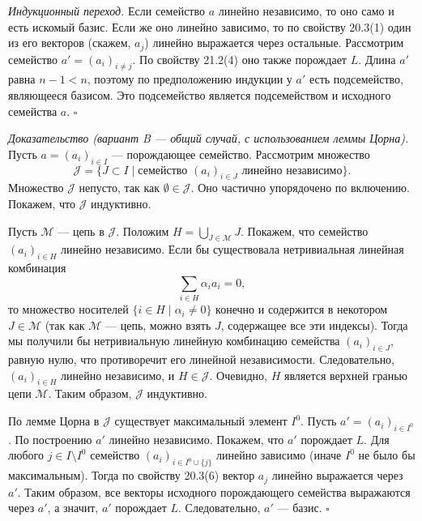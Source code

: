 \documentclass[a4paper,12pt]{article}
\theoremstyle{definition}
\theoremstyle{plain}
\theoremstyle{remark}
\begin{document}
	\textit{Индукционный переход.} Если семейство \( a \) линейно независимо, то оно само и есть искомый базис. Если же оно линейно зависимо, то по свойству 20.3(1) один из его векторов (скажем, \( a_j \)) линейно выражается через остальные. Рассмотрим семейство \( a' = (a_i)_{i \neq j} \). По свойству 21.2(4) оно также порождает \( L \). Длина \( a' \) равна \( n-1 < n \), поэтому по предположению индукции у \( a' \) есть подсемейство, являющееся базисом. Это подсемейство является подсемейством и исходного семейства \( a \). \hfill \(\square\)
	
	\medskip
	\textit{Доказательство (вариант B — общий случай, с использованием леммы Цорна).}
	Пусть \( a = (a_i)_{i \in I} \) — порождающее семейство. Рассмотрим множество
	\[
	\mathcal{J} = \{ J \subset I \mid \text{семейство } (a_i)_{i \in J} \text{ линейно независимо} \}.
	\]
	Множество \( \mathcal{J} \) непусто, так как \( \emptyset \in \mathcal{J} \). Оно частично упорядочено по включению. Покажем, что \( \mathcal{J} \) индуктивно.
	
	Пусть \( \mathcal{M} \) — цепь в \( \mathcal{J} \). Положим \( H = \bigcup_{J \in \mathcal{M}} J \). Покажем, что семейство \( (a_i)_{i \in H} \) линейно независимо. Если бы существовала нетривиальная линейная комбинация
	\[
	\sum_{i \in H} \alpha_i a_i = 0,
	\]
	то множество носителей \( \{ i \in H \mid \alpha_i \neq 0 \} \) конечно и содержится в некотором \( J \in \mathcal{M} \) (так как \( \mathcal{M} \) — цепь, можно взять \( J \), содержащее все эти индексы). Тогда мы получили бы нетривиальную линейную комбинацию семейства \( (a_i)_{i \in J} \), равную нулю, что противоречит его линейной независимости. Следовательно, \( (a_i)_{i \in H} \) линейно независимо, и \( H \in \mathcal{J} \). Очевидно, \( H \) является верхней гранью цепи \( \mathcal{M} \). Таким образом, \( \mathcal{J} \) индуктивно.
	
	По лемме Цорна в \( \mathcal{J} \) существует максимальный элемент \( I^0 \). Пусть \( a' = (a_i)_{i \in I^0} \). По построению \( a' \) линейно независимо. Покажем, что \( a' \) порождает \( L \). Для любого \( j \in I \setminus I^0 \) семейство \( (a_i)_{i \in I^0 \cup \{j\}} \) линейно зависимо (иначе \( I^0 \) не было бы максимальным). Тогда по свойству 20.3(6) вектор \( a_j \) линейно выражается через \( a' \). Таким образом, все векторы исходного порождающего семейства выражаются через \( a' \), а значит, \( a' \) порождает \( L \). Следовательно, \( a' \) — базис. \hfill \(\square\)
	
	
	
\end{document}
